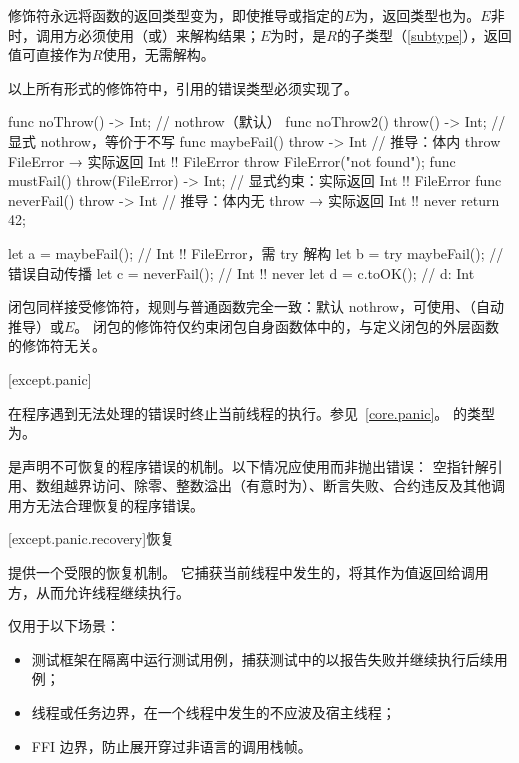 \pnum
{}修饰符永远将函数的返回类型变为，即使推导或指定的$E$为，返回类型也为。$E$非时，调用方必须使用（或）来解构结果；$E$为时，是$R$的子类型（\ref{subtype}），返回值可直接作为$R$使用，无需解构。

\pnum
以上所有形式的修饰符中，引用的错误类型必须实现了。

\pnum
\enterexample
\begin{codeblock}
func noThrow() -> Int;                   // nothrow（默认）
func noThrow2() throw() -> Int;          // 显式 nothrow，等价于不写
func maybeFail() throw -> Int {          // 推导：体内 throw FileError → 实际返回 Int !! FileError
    throw FileError("not found");
}
func mustFail() throw(FileError) -> Int; // 显式约束：实际返回 Int !! FileError
func neverFail() throw -> Int {          // 推导：体内无 throw → 实际返回 Int !! never
    return 42;
}

let a = maybeFail();                     // Int !! FileError，需 try 解构
let b = try maybeFail();                 // 错误自动传播
let c = neverFail();                     // Int !! never
let d = c.toOK();                        // d: Int
\end{codeblock}
\exitexample

\pnum
闭包同样接受修饰符，规则与普通函数完全一致：默认 nothrow，可使用、（自动推导）或$E$\tcode{)}。
闭包的修饰符仅约束闭包自身函数体中的，与定义闭包的外层函数的修饰符无关。

[except.panic]{}

\pnum
{}在程序遇到无法处理的错误时终止当前线程的执行。参见~\ref{core.panic}。
的类型为。

\pnum
{}是声明不可恢复的程序错误的机制。以下情况应使用而非抛出错误：
空指针解引用、数组越界访问、除零、整数溢出（有意时为）、断言失败、合约违反及其他调用方无法合理恢复的程序错误。

[except.panic.recovery]{恢复}

\pnum
{}提供一个受限的恢复机制。
它捕获当前线程中发生的，将其作为值返回给调用方，从而允许线程继续执行。

\pnum
{}仅用于以下场景：
\begin{itemize}
\item 测试框架在隔离中运行测试用例，捕获测试中的以报告失败并继续执行后续用例；
\item 线程或任务边界，在一个线程中发生的不应波及宿主线程；
\item FFI 边界，防止展开穿过非\X 语言的调用栈帧。
\end{itemize}

